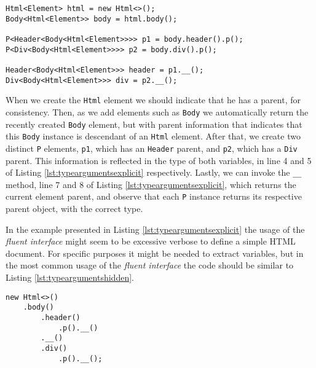 \bigskip


\begin{minipage}{\linewidth}
\begin{lstlisting}[caption={Example of the Explicit Use of Type Arguments},captionpos=b,label={lst:typeargumentsexplicit}]
Html<Element> html = new Html<>();
Body<Html<Element>> body = html.body();
        
P<Header<Body<Html<Element>>>> p1 = body.header().p();
P<Div<Body<Html<Element>>>> p2 = body.div().p();
        
Header<Body<Html<Element>>> header = p1.__();
Div<Body<Html<Element>>> div = p2.__();
\end{lstlisting}
\end{minipage}

\noindent
When we create the \texttt{Html} element we should indicate that he has a parent, for consistency. Then, as we add elements such as \texttt{Body} we automatically return the recently created \texttt{Body} element, but with parent information that indicates that this \texttt{Body} instance is descendant of an \texttt{Html} element. After that, we create two distinct \texttt{P} elements, \texttt{p1}, which has an \texttt{Header} parent, and \texttt{p2}, which has a \texttt{Div} parent. This information is reflected in the type of both variables, in line 4 and 5 of Listing \ref{lst:typeargumentsexplicit} respectively. Lastly, we can invoke the \texttt{\_\_} method, line 7 and 8 of Listing \ref{lst:typeargumentsexplicit}, which returns the current element parent, and observe that each \texttt{P} instance returns its respective parent object, with the correct type.

\noindent
In the example presented in Listing \ref{lst:typeargumentsexplicit} the usage of the \textit{fluent interface} might seem to be excessive verbose to define a simple \ac{HTML} document. For specific purposes it might be needed to extract variables, but in the most common usage of the \textit{fluent interface}  the code should be similar to Listing \ref{lst:typeargumentshidden}.  

\bigskip


\begin{minipage}{\linewidth}
\begin{lstlisting}[caption={Example of the Implicit Use of Type Arguments},captionpos=b,label={lst:typeargumentshidden}]
new Html<>()
    .body()
        .header()
            .p().__()
        .__()
        .div()
            .p().__();
\end{lstlisting}
\end{minipage}

